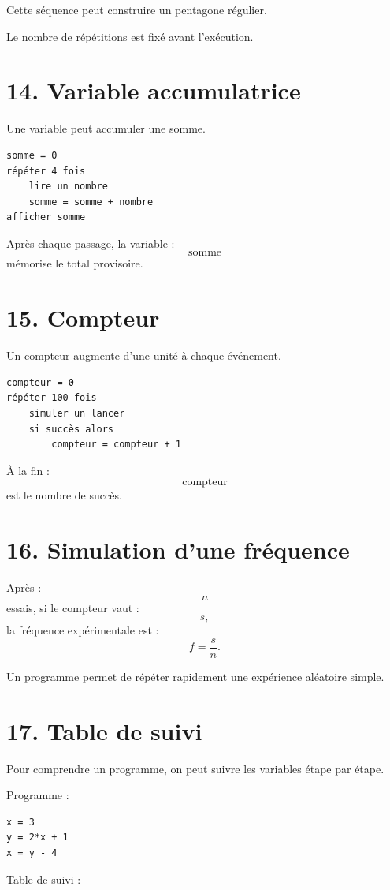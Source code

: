 Cette séquence peut construire un pentagone régulier.

Le nombre de répétitions est fixé avant l'exécution.

\section{14. Variable accumulatrice}

Une variable peut accumuler une somme.

\begin{verbatim}
somme = 0
répéter 4 fois
    lire un nombre
    somme = somme + nombre
afficher somme
\end{verbatim}

Après chaque passage, la variable :
\[
\text{somme}
\]
mémorise le total provisoire.

\section{15. Compteur}

Un compteur augmente d'une unité à chaque événement.

\begin{verbatim}
compteur = 0
répéter 100 fois
    simuler un lancer
    si succès alors
        compteur = compteur + 1
\end{verbatim}

À la fin :
\[
\text{compteur}
\]
est le nombre de succès.

\section{16. Simulation d'une fréquence}

Après :
\[
n
\]
essais, si le compteur vaut :
\[
s,
\]
la fréquence expérimentale est :
\[
f=\dfrac sn.
\]

Un programme permet de répéter rapidement une expérience aléatoire simple.

\section{17. Table de suivi}

Pour comprendre un programme, on peut suivre les variables étape par étape.

Programme :
\begin{verbatim}
x = 3
y = 2*x + 1
x = y - 4
\end{verbatim}

Table de suivi :

